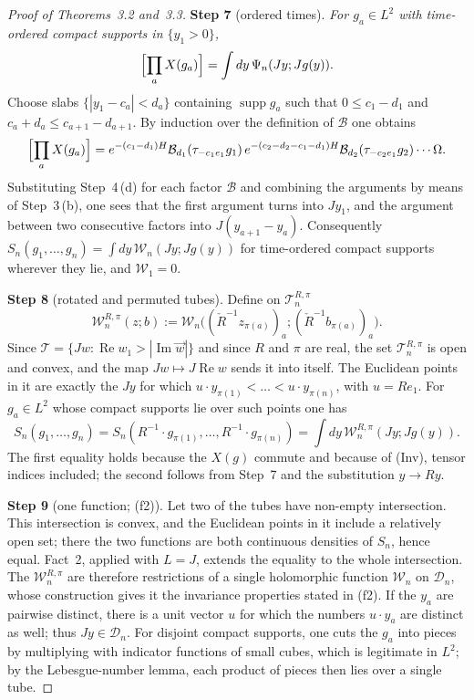 \documentclass[11pt]{amsart}
\theoremstyle{definition}
\begin{document}
\begin{proof}[Proof of Theorems~3.2 and~3.3]
\textbf{Step 7} (ordered times).
\emph{For $g_a\in L^2$ with time-ordered compact supports in $\{y_1>0\}$,}
\begin{equation*}
\Bigl[\prod_aX(g_a)\Bigr]=\int dy\,\Psi_n(Jy;Jg(y)).
\end{equation*}
Choose slabs $\{|y_1-c_a|<d_a\}$ containing $\operatorname{supp}g_a$ such that $0\le c_1-d_1$ and $c_a+d_a\le c_{a+1}-d_{a+1}$.
By induction over the definition of $\mathcal B$ one obtains
\begin{equation*}
\Bigl[\prod_aX(g_a)\Bigr]=e^{-(c_1-d_1)H}\mathcal B_{d_1}(\tau_{-c_1e_1}g_1)\,e^{-(c_2-d_2-c_1-d_1)H}\mathcal B_{d_2}(\tau_{-c_2e_1}g_2)\cdots\Omega.
\end{equation*}
Substituting Step~4\,(d) for each factor $\mathcal B$ and combining the arguments by means of Step~3\,(b), one sees that the first argument turns into $Jy_1$, and the argument between two consecutive factors into $J(y_{a+1}-y_a)$.
Consequently $S_n(g_1,\dots,g_n)=\int dy\,\mathcal W_n(Jy;Jg(y))$ for time-ordered compact supports wherever they lie, and $\mathcal W_1=0$.

\textbf{Step 8} (rotated and permuted tubes).
Define on $\mathcal T_n^{R,\pi}$
\begin{equation*}
\mathcal W_n^{R,\pi}(z;b):=\mathcal W_n\bigl((\check R^{-1}z_{\pi(a)})_a;(\check R^{-1}b_{\pi(a)})_a\bigr).
\end{equation*}
Since $\mathcal T=\{Jw:\operatorname{Re}w_1>|\operatorname{Im}\vec w|\}$ and since $R$ and $\pi$ are real, the set $\mathcal T_n^{R,\pi}$ is open and convex, and the map $Jw\mapsto J\operatorname{Re}w$ sends it into itself.
The Euclidean points in it are exactly the $Jy$ for which $u\cdot y_{\pi(1)}<\dots<u\cdot y_{\pi(n)}$, with $u=Re_1$.
For $g_a\in L^2$ whose compact supports lie over such points one has
\begin{equation*}
S_n(g_1,\dots,g_n)=S_n(R^{-1}\cdot g_{\pi(1)},\dots,R^{-1}\cdot g_{\pi(n)})=\int dy\,\mathcal W_n^{R,\pi}(Jy;Jg(y)).
\end{equation*}
The first equality holds because the $X(g)$ commute and because of (Inv), tensor indices included; the second follows from Step~7 and the substitution $y\to Ry$.

\textbf{Step 9} (one function; (f2)).
Let two of the tubes have non-empty intersection.
This intersection is convex, and the Euclidean points in it include a relatively open set; there the two functions are both continuous densities of $S_n$, hence equal.
Fact~2, applied with $L=J$, extends the equality to the whole intersection.
The $\mathcal W_n^{R,\pi}$ are therefore restrictions of a single holomorphic function $\mathcal W_n$ on $\mathcal D_n$, whose construction gives it the invariance properties stated in (f2).
If the $y_a$ are pairwise distinct, there is a unit vector $u$ for which the numbers $u\cdot y_a$ are distinct as well; thus $Jy\in\mathcal D_n$.
For disjoint compact supports, one cuts the $g_a$ into pieces by multiplying with indicator functions of small cubes, which is legitimate in $L^2$; by the Lebesgue-number lemma, each product of pieces then lies over a single tube.


\end{proof}
\end{document}
